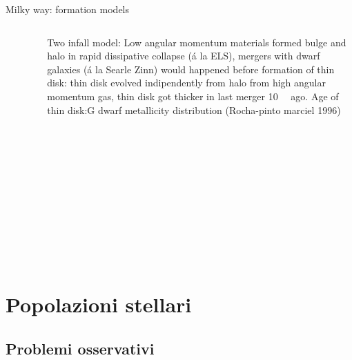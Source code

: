 \begin{frame}{Milky way: formation models}
\begin{columns}[T]
\begin{column}{0.45\textwidth}
\begin{figure}[!ht]\texttt{[image: MWformation]}\label{fig:MWformation}
\end{figure}
\end{column}
\begin{column}{0.45\textwidth}
Two infall model: Low angular momentum materials formed bulge and halo in rapid dissipative collapse (\'a la ELS), mergers with dwarf galaxies (\'a la Searle Zinn) would happened before formation of thin disk: thin disk evolved indipendently from halo from high angular momentum gas, thin disk got thicker in last merger \SI{10}{\giga\year} ago.
Age of thin disk:G dwarf metallicity distribution (Rocha-pinto marciel 1996)
\end{column}
\end{columns}
\end{frame}

\section{Popolazioni stellari}

\subsection{Problemi osservativi}

